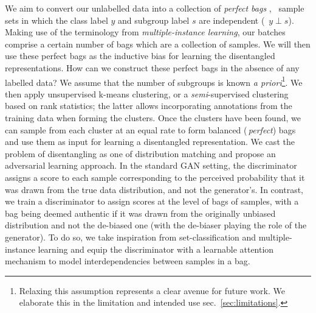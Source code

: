 We aim to convert our unlabelled data into a collection of \emph{perfect bags} \citep{kleinberg2016inherent,chouldechova2017fair}, \ie\ sample sets in which the class label $y$ and subgroup label $s$ are independent (\ie\ $y\perp s$).
Making use of the terminology from \emph{multiple-instance learning}, our batches comprise a certain number of bags which are a collection of samples.
%
We will then use these perfect bags as the inductive bias for learning the disentangled representations. 
%
How can we construct these perfect bags in the absence of any labelled data?
%
We assume that the number of subgroups is known \emph{a priori}\footnote{Relaxing this assumption represents a clear avenue for future work. We elaborate this in the limitation and intended use sec.~\ref{sec:limitations}.}. 
%
We then apply unsupervised k-means clustering, or a \emph{semi}-supervised clustering based on rank statistics; the latter allows incorporating annotations from the training data when forming the clusters.
%
Once the clusters have been found, we can sample from each cluster at an equal rate to form balanced (\ie\,\emph{perfect}) bags and use them as input for learning a disentangled representation. 
%
We cast the problem of disentangling as one of distribution matching and propose an adversarial learning approach.
In the standard GAN setting, the discriminator assigns a score to each sample corresponding to the perceived probability that it was drawn from the true data distribution, and not the generator's.
In contrast, we train a discriminator to assign scores at the level of bags of samples, with a bag being deemed authentic if it was drawn from the originally unbiased distribution and not the de-biased one (with the de-biaser playing the role of the generator). To do so, we take inspiration from set-classification and multiple-instance learning and equip the discriminator with a learnable attention mechanism to model interdependencies between samples in a bag.

